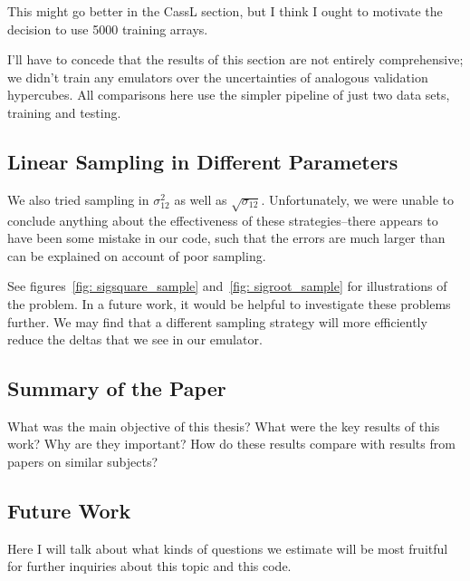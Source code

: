 \documentclass[11pt]{article}
\begin{document}
This might go better in the CassL section, but I think I ought to motivate the decision to use 5000 training arrays.

I'll have to concede that the results of this section are not entirely comprehensive; we didn't train any emulators over the uncertainties of analogous validation hypercubes. All comparisons here use the simpler pipeline of just two data sets, training and testing.

\begin{centering}
\subsection{Linear Sampling in Different Parameters}
\end{centering}

We also tried sampling in $\sigma_{12}^2$ as well as $\sqrt{\sigma_{12}}$.
Unfortunately, we were unable to conclude anything about the effectiveness of
these strategies--there appears to have been some mistake in our code, such
that the errors are much larger than can be explained on account of poor
sampling.

See figures~\ref{fig: sigsquare_sample} and~\ref{fig: sigroot_sample} for
illustrations of the problem. In a future work, it would be helpful to
investigate these problems further. We may find that a different sampling
strategy will more efficiently reduce the deltas that we see in our emulator.

\begin{centering}
\subsection{Summary of the Paper}
\end{centering}

What was the main objective of this thesis? What were the key results of this work? Why are they important? How do these results compare with results from papers on similar subjects?

\begin{centering}
\subsection{Future Work}
\label{sec: future_work}
\end{centering}

Here I will talk about what kinds of questions we estimate will be most fruitful for further inquiries about this topic and this code.
\end{document}
